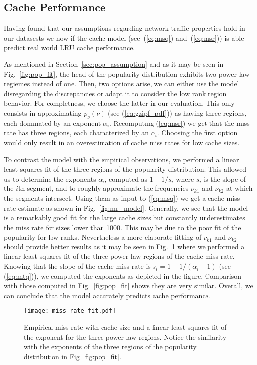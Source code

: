 \documentclass[twocolumn, 10pt]{article}
\theoremstyle{plain}
\begin{document}
\subsection{Cache Performance}\label{sec:cache_res}

Having found that our assumptions regarding network traffic properties hold in
our datasests we now if the cache model (see~(\ref{eq:msq})
and~(\ref{eq:msr})) is able predict real world LRU cache performance. 

As mentioned in Section~\ref{sec:pop_assumption} and as it may be seen in
Fig.~\ref{fig:pop_fit}, the head of the popularity distribution exhibits two
power-law regiemes instead of one. Then, two options arise, we can either use
the model disregarding the discrepancies or adapt it to consider the low rank
region behavior. For completness, we choose the latter in our evaluation. This
only consists in approximating $p_\nu(\nu)$ (see (\ref{eq:gzipf_pdf})) as
having three regions, each dominated by an exponent $\alpha_i$. Recomputing
(\ref{eq:msr}) we get that the miss rate has three regions, each
characterized by an $\alpha_i$. Choosing the first option would only
result in an overestimation of cache miss rates for low cache sizes.

To contrast the model with the empirical observations, we performed a linear
least squares fit of the three regions of the popularity distribution. This
allowed us to determine the exponents $\alpha_i$, computed as
$1 + 1/s_i$ where $s_i$ is the slope of the $i$th segment,  and to
roughly approximate the frequencies $\nu_{k1}$ and $\nu_{k2}$ at which the
segments intersect. Using them as input to (\ref{eq:msq}) we get a cache miss
rate estimate as shown in Fig.~\ref{fig:mr_model}. Generally, we see that the
model is a remarkably good fit for the large cache sizes but constantly underestimates the
miss rate for sizes lower than 1000. This may be due to the
poor fit of the popularity for low ranks. Nevertheless a more elaborate fitting of
$\nu_{k1}$ and $\nu_{k2}$ should provide better results as it may be seen
in Fig.~\ref{fig:mr_fit} where we performed a linear least squares fit of the three
power law regions of the cache miss rate. Knowing that the slope of the cache
miss rate is $s_i=1-1/(\alpha_i-1)$ (see (\ref{eq:mtq})), we computed the
exponents as depicted in the figure. Comparison with those computed in
Fig.~\ref{fig:pop_fit} shows they are very similar. Overall, we can conclude
that the model accurately predicts cache performance. 

\begin{figure}[t]
    \centering
    \texttt{[image: miss\_rate\_fit.pdf]}
    \caption{Empirical miss rate with cache size and a linear least-squares
    fit of the exponent for the three power-law regions. Notice the
    similarity with the exponents of the three regions of the popularity
    distribution in Fig~\ref{fig:pop_fit}. }
    \label{fig:mr_fit}
\end{figure}
\end{document}
